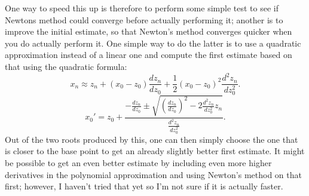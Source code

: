 \documentclass[12pt,a4paper]{article}
\begin{document}
One way to speed this up is therefore to perform some simple test to see if Newtons method could converge before actually performing it; another is to improve the initial estimate, so that Newton's method converges quicker when you do actually perform it. One simple way to do the latter is to use a quadratic approximation instead of a linear one and compute the first estimate based on that using the quadratic formula:
$$x_n \approx z_n+(x_0-z_0)\frac{dz_n}{dz_0}+\frac{1}{2}(x_0-z_0)^2\frac{d^2z_n}{dz_0^2}.$$
$$x_0' = z_0+\frac{-\frac{dz_n}{dz_0}\pm\sqrt{(\frac{dz_n}{dz_0})^2-2\frac{d^2z_n}{dz_0^2}z_n}}{\frac{d^2z_n}{dz_0^2}}.$$
Out of the two roots produced by this, one can then simply choose the one that is closer to the base point to get an already slightly better first estimate. It might be possible to get an even better estimate by including even more higher derivatives in the polynomial approximation and using Newton's method on that first; however, I haven't tried that yet so I'm not sure if it is actually faster.
\end{document}
